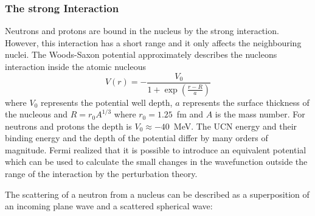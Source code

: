 

\subsubsection{The strong Interaction}
Neutrons and protons are bound in the nucleus by the strong
interaction. However, this interaction has a short range and it only
affects the neighbouring nuclei.
The Woods-Saxon potential approximately
describes the nucleons interaction inside the atomic nucleous
\begin{equation}
  \label{eqn:woodsax}
  V(r) = - \frac{V_0}{1+\exp(\frac{r-R}{a})}
\end{equation}
where $V_0$ represents the potential well depth, $a$ represents the
surface thickness of the nucleous and $R = r_0 A^{1/3}$ where
$r_0 = 1.25$~fm and $A$ is the mass number. For neutrons and protons
the depth is $V_0 \approx -40$~MeV. The UCN energy and their binding
energy and the depth of the potential differ by many orders of
magnitude.
Fermi realized that it is possible to introduce an equivalent
potential which can be used to calculate the small changes in the
wavefunction outside the range of the interaction by the perturbation
theory.


The scattering of a neutron from a nucleus can be described as a
superposition of an incoming plane wave and a scattered spherical
wave:

